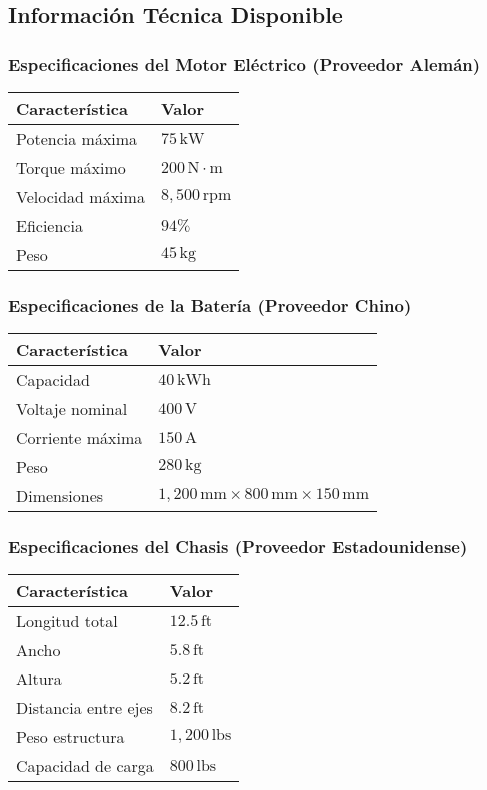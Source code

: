 \documentclass{article}
\begin{document}
\subsection*{Información Técnica Disponible}

\subsubsection*{Especificaciones del Motor Eléctrico (Proveedor Alemán)}
\begin{tabular}{|l|l|}
\hline
\textbf{Característica} & \textbf{Valor} \\
\hline
Potencia máxima & $75 \, \text{kW}$ \\
Torque máximo & $200 \, \text{N} \cdot \text{m}$ \\
Velocidad máxima & $8,500 \, \text{rpm}$ \\
Eficiencia & $94\%$ \\
Peso & $45 \, \text{kg}$ \\
\hline
\end{tabular}

\subsubsection*{Especificaciones de la Batería (Proveedor Chino)}
\begin{tabular}{|l|l|}
\hline
\textbf{Característica} & \textbf{Valor} \\
\hline
Capacidad & $40 \, \text{kWh}$ \\
Voltaje nominal & $400 \, \text{V}$ \\
Corriente máxima & $150 \, \text{A}$ \\
Peso & $280 \, \text{kg}$ \\
Dimensiones & $1,200 \, \text{mm} \times 800 \, \text{mm} \times 150 \, \text{mm}$ \\
\hline
\end{tabular}

\subsubsection*{Especificaciones del Chasis (Proveedor Estadounidense)}
\begin{tabular}{|l|l|}
\hline
\textbf{Característica} & \textbf{Valor} \\
\hline
Longitud total & $12.5 \, \text{ft}$ \\
Ancho & $5.8 \, \text{ft}$ \\
Altura & $5.2 \, \text{ft}$ \\
Distancia entre ejes & $8.2 \, \text{ft}$ \\
Peso estructura & $1,200 \, \text{lbs}$ \\
Capacidad de carga & $800 \, \text{lbs}$ \\
\hline
\end{tabular}
\end{document}
